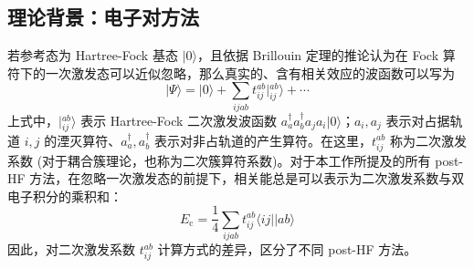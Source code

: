 \subsection{理论背景：电子对方法}
\label{sec.iepa-theory}

若参考态为 Hartree-Fock 基态 $| 0 \rangle$，且依据 Brillouin 定理的推论认为在 Fock 算符下的一次激发态可以近似忽略，那么真实的、含有相关效应的波函数可以写为
\begin{equation}
  | \Psi \rangle = | 0 \rangle + \sum_{ijab} t_{ij}^{ab} | {}_{ij}^{ab} \rangle + \cdots
\end{equation}
上式中，$| {}_{ij}^{ab} \rangle$ 表示 Hartree-Fock 二次激发波函数 $a_a^\dagger a_b^\dagger a_j a_i | 0 \rangle$；$a_i, a_j$ 表示对占据轨道 $i, j$ 的湮灭算符、$a_a^\dagger, a_b^\dagger$ 表示对非占轨道的产生算符。在这里，$t_{ij}^{ab}$ 称为二次激发系数 (对于耦合簇理论，也称为二次簇算符系数)。对于本工作所提及的所有 post-HF 方法，在忽略一次激发态的前提下，相关能总是可以表示为二次激发系数与双电子积分的乘积和：
\begin{equation}
  E_\mathrm{c} = \frac{1}{4} \sum_{ijab} t_{ij}^{ab} \langle ij || ab \rangle
\end{equation}
因此，对二次激发系数 $t_{ij}^{ab}$ 计算方式的差异，区分了不同 post-HF 方法。

